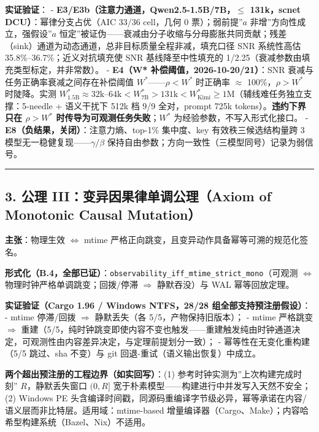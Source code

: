 \textbf{实证验证}： -
\textbf{E3/E3b（注意力通道，Qwen2.5-1.5B/7B，\(\le\) 131k，scnet
DCU）}：幂律分支占优（AIC 33/36 cell，几何 0 票）；弱前提''\(a\)
非增''方向性成立，强假设''\(a\)
恒定''被证伪------衰减由分子收缩与分母膨胀共同贡献；残差（sink）通道为动态通道，总非目标质量全程非减，填充口径
SNR 系统性高估 35.8\%--36.7\%；近义对抗填充使 SNR 基线降至中性填充的
1/2.25（衰减参数由填充类型标定，并非常数）。 - \textbf{E4（W*
补偿阈值，2026-10-20/21）}：SNR 衰减与任务正确率衰减之间存在补偿阈值
\(W^*\)------\(\rho < W^*\) 时正确率 \(\approx\) 100\%，\(\rho > W^*\)
时陡降。实测
\(W^*_{1.5\text{B}} \approx 32\text{k–64k} < W^*_{7\text{B}} > 131\text{k} < W^*_{\text{Kimi}} \ge 1\text{M}\)（辅线难任务独立支撑：5-needle
+ 语义干扰下 512k 档 9/9 全对，prompt 725k
tokens）。\textbf{违约下界只在 \(\rho > W^*\)
时传导为可观测任务失败}；\(W^*\) 为经验参数，不写入形式化接口。 -
\textbf{E8（负结果，关闭）}：注意力熵、top-1\% 集中度、key
有效秩三候选结构量跨 3 模型无一稳健复现------\(\gamma/\beta\)
保持自由参数；方向一致性（三模型同号）记录为弱信号。

\begin{center}\rule{0.5\linewidth}{0.5pt}\end{center}

\subsection{3. 公理 III：变异因果律单调公理（Axiom of Monotonic Causal
Mutation）}\label{ux516cux7406-iiiux53d8ux5f02ux56e0ux679cux5f8bux5355ux8c03ux516cux7406axiom-of-monotonic-causal-mutation-1}

\textbf{主张}：物理生效 \(\Leftrightarrow\) mtime
严格正向跳变，且变异动作具备幂等可溯的规范化签名。

\textbf{形式化（B.4，全部已证）}：\texttt{observability\_iff\_mtime\_strict\_mono}（可观测
\(\Leftrightarrow\) 物理时钟严格单调跳变；回拨/停滞 \(\Rightarrow\)
静默吞没）与 WAL 幂等回放定理。

\textbf{实证验证（Cargo 1.96 / Windows NTFS，28/28
组全部支持预注册假设）}： - mtime 停滞/回拨 \(\Rightarrow\) 静默丢失（各
5/5，产物保持旧版本）； - mtime 严格跳变 \(\Rightarrow\)
重建（5/5，纯时钟跳变即使内容不变也触发------重建触发纯由时钟通道决定，可观测性由内容差异决定，与定理前提划分一致）；
- 幂等性在无变化重构建（5/5 跳过、sha 不变）与 git
回退-重试（语义输出恢复）中成立。

\textbf{两个超出预注册的工程边界（如实回写）}：(1)
参考时钟实测为''上次构建完成时刻'' \(R\)，静默丢失窗口 \((0,R]\)
宽于朴素模型------构建进行中并发写入天然不安全；(2) Windows PE
头含编译时间戳，同源码重编译字节级必异，幂等承诺在内容/语义层而非比特层。适用域：mtime-based
增量编译器（Cargo、Make）；内容哈希型构建系统（Bazel、Nix）不适用。


